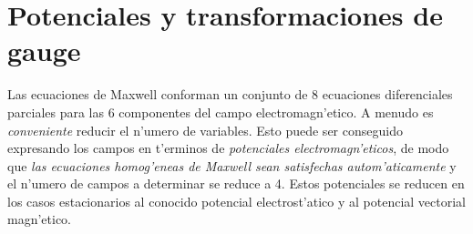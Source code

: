 \section{Potenciales y transformaciones de gauge}

Las ecuaciones de Maxwell conforman un conjunto de 8 ecuaciones diferenciales
parciales para las 6 componentes del campo electromagn'etico. A menudo es
\textit{conveniente} reducir el n'umero de variables. Esto puede ser conseguido
expresando los campos en t'erminos de \textit{potenciales electromagn'eticos},
de modo que \textit{las ecuaciones homog'eneas de Maxwell sean satisfechas
autom'aticamente} y el n'umero de campos a determinar se reduce a 4. Estos
potenciales se reducen en los casos estacionarios al conocido potencial
electrost'atico y al potencial vectorial magn'etico.

